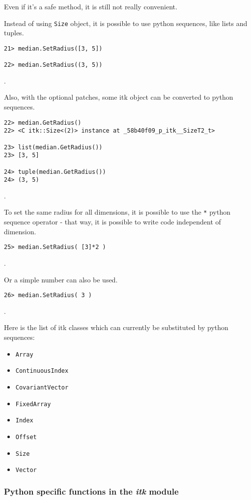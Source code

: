 \documentclass{InsightArticle}
\begin{document}
Even if it's a safe method, it is still not really convenient.

Instead of using \verb$Size$ object, it is possible to use python sequences, like lists
and tuples.

\begin{verbatim}
21> median.SetRadius([3, 5])

22> median.SetRadius((3, 5))
\end{verbatim}.

Also, with the optional patches, some itk object can be converted to python sequences.

\begin{verbatim}
22> median.GetRadius()
22> <C itk::Size<(2)> instance at _58b40f09_p_itk__SizeT2_t>

23> list(median.GetRadius())
23> [3, 5]

24> tuple(median.GetRadius())
24> (3, 5)
\end{verbatim}.

To set the same radius for all dimensions, it is possible to use the \verb$*$ python
sequence operator - that way, it is possible to write code independent of dimension.

\begin{verbatim}
25> median.SetRadius( [3]*2 )
\end{verbatim}.

Or a simple number can also be used.

\begin{verbatim}
26> median.SetRadius( 3 )
\end{verbatim}.

Here is the list of itk classes which can currently be substituted by python sequences:
\begin{itemize}
  \item \verb$Array$
  \item \verb$ContinuousIndex$
  \item \verb$CovariantVector$
  \item \verb$FixedArray$
  \item \verb$Index$
  \item \verb$Offset$
  \item \verb$Size$
  \item \verb$Vector$
\end{itemize}

     \subsubsection{Python specific functions in the {\em itk} module}
\end{document}
